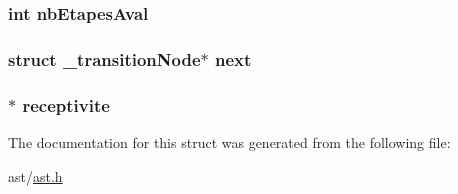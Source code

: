 \subsubsection[{\texorpdfstring{nb\+Etapes\+Aval}{nbEtapesAval}}]{\setlength{\rightskip}{0pt plus 5cm}int nb\+Etapes\+Aval}\hypertarget{struct__transition_node_acce8a1259c8588acfc2368711f0a353a}{}\label{struct__transition_node_acce8a1259c8588acfc2368711f0a353a}
\subsubsection[{\texorpdfstring{next}{next}}]{\setlength{\rightskip}{0pt plus 5cm}struct {\bf \+\_\+transition\+Node}$\ast$ next}\hypertarget{struct__transition_node_a0f7b7df0c2ac19f3c902dad0f560a1bd}{}\label{struct__transition_node_a0f7b7df0c2ac19f3c902dad0f560a1bd}
\subsubsection[{\texorpdfstring{receptivite}{receptivite}}]{$\ast$ receptivite}\hypertarget{struct__transition_node_a7860dac0e1d3741069388343aa0d8780}{}\label{struct__transition_node_a7860dac0e1d3741069388343aa0d8780}


The documentation for this struct was generated from the following file\+:\begin{DoxyCompactItemize}
\item 
ast/\hyperlink{ast_8h}{ast.\+h}\end{DoxyCompactItemize}
